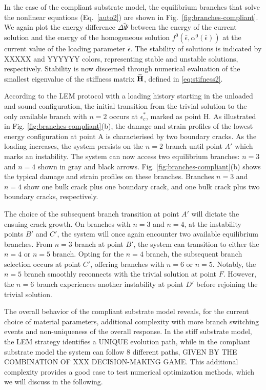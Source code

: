 In the case of the compliant substrate model, the equilibrium branches that solve the nonlinear equations (Eq.~\ref{auto2}) are shown in Fig.~\ref{fig:branches-compliant}. 
We again plot the energy difference $\Delta \widetilde\Psi$ between the energy of the current solution and the energy of the homogeneous solution $f^0(\bar{\epsilon}, \alpha^0(\bar{\epsilon}))$ at the current value of the loading parameter $\bar\epsilon$. 
The stability of solutions is indicated by XXXXX and YYYYYY colors, representing stable and unstable solutions, respectively. Stability is now discerned through numerical evaluation of the smallest eigenvalue of the stiffness matrix $\widetilde{\mathbf{H}}$, defined in \eqref{eq:stifness2}.

According to the LEM protocol with a loading history starting in the unloaded and sound configuration, the initial transition from the trivial solution to the only available branch with $n=2$ occurs at $\epsilon_c^*$, marked as point H. As illustrated in Fig. \ref{fig:branches-compliant}(b), the damage and strain profiles of the lowest energy configuration at point A is characterised by two boundary cracks. As the loading increases, the system persists on the $n=2$ branch until point $A'$ which marks an instability. The system can now access two equilibrium branches: $n=3$ and $n=4$ shown in gray and black arrows. Fig. \ref{fig:branches-compliant}(b) shows the typical damage and strain profiles on these branches. Branches $n=3$ and $n=4$ show one bulk crack plus one boundary crack, and one bulk crack plus two boundary cracks, respectively. 

The choice of the subsequent branch transition at point $A'$ will dictate the ensuing crack growth. On branches with $n=3$ and $n=4$, at the instability points $B'$ and $C'$, the system will once again encounter two available equilibrium branches. From $n=3$ branch  at point $B'$, the system can transition to either the $n=4$ or $n=5$ branch. Opting for the $n=4$ branch, the subsequent branch selection occurs at point $C'$, offering branches with $n=6$ or $n=5$. Notably, the $n=5$ branch smoothly reconnects with the trivial solution at point $F$. However, the $n=6$ branch experiences another instability at point $D'$ before rejoining the trivial solution. 

The overall behavior of the compliant substrate model reveals, for the current choice of material parameters, additional complexity with more branch switching events and non-uniqueness of the overall response.  In the stiff substrate model, the LEM strategy identifies a UNIQUE evolution path, while in the compliant substrate model the system can follow 8 different paths, GIVEN BY THE COMBINATION OF XXX DECISION-MAKING GAME. This additional complexity provides a good case to test numerical optimization methods, which we will discuss in the following.

